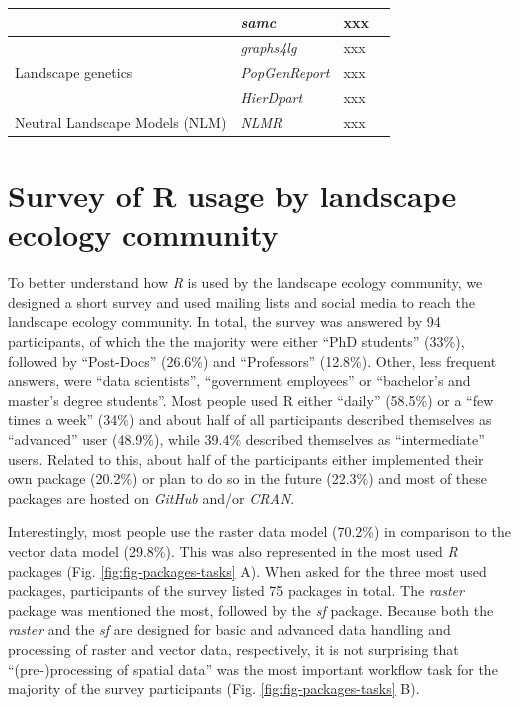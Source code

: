 \documentclass[smallextended]{svjour3}       %
\begin{document}
\begin{landscape}
\begin{table}
\begin{tabularx}{0.9\linewidth}{XXXX}
      & \textit{samc} & xxx & \cite{Marx2020} \\
      \hline
      \multirow{3}{*}{Landscape genetics} & \textit{graphs4lg} & xxx & \cite{Savary2020} \\
      & \textit{PopGenReport} & xxx & \cite{Adamack2014,Gruber2015} \\
      & \textit{HierDpart} & xxx & \cite{Qin2019} \\
      \hline
      Neutral Landscape Models (NLM) & \textit{NLMR} & xxx & \cite{Sciaini2018} \\
      \hline
    \end{tabularx}
  \end{table}

\end{landscape}

\hypertarget{survey-of-r-usage-by-landscape-ecology-community}{%
\section{Survey of R usage by landscape ecology community}\label{survey-of-r-usage-by-landscape-ecology-community}}

To better understand how \emph{R} is used by the landscape ecology community, we designed a short survey and used mailing lists and social media to reach the landscape ecology community.
In total, the survey was answered by 94 participants, of which the the majority were either ``PhD students'' (33\%), followed by ``Post-Docs'' (26.6\%) and ``Professors'' (12.8\%). Other, less frequent answers, were ``data scientists'', ``government employees'' or ``bachelor's and master's degree students''.
Most people used R either ``daily'' (58.5\%) or a ``few times a week'' (34\%) and about half of all participants described themselves as ``advanced'' user (48.9\%), while 39.4\% described themselves as ``intermediate'' users.
Related to this, about half of the participants either implemented their own package (20.2\%) or plan to do so in the future (22.3\%) and most of these packages are hosted on \emph{GitHub} and/or \emph{CRAN}.

Interestingly, most people use the raster data model (70.2\%) in comparison to the vector data model (29.8\%).
This was also represented in the most used \emph{R} packages (Fig. \ref{fig:fig-packages-tasks} A).
When asked for the three most used packages, participants of the survey listed 75 packages in total.
The \emph{raster} package was mentioned the most, followed by the \emph{sf} package.
Because both the \emph{raster} and the \emph{sf} are designed for basic and advanced data handling and processing of raster and vector data, respectively, it is not surprising that ``(pre-)processing of spatial data'' was the most important workflow task for the majority of the survey participants (Fig. \ref{fig:fig-packages-tasks} B).
\end{document}

